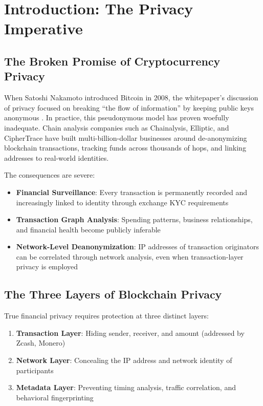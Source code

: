\documentclass[11pt,a4paper]{article}
\begin{document}
\newpage
\tableofcontents
\newpage

\section{Introduction: The Privacy Imperative}

\subsection{The Broken Promise of Cryptocurrency Privacy}

When Satoshi Nakamoto introduced Bitcoin in 2008, the whitepaper's discussion of privacy focused on breaking ``the flow of information'' by keeping public keys anonymous \cite{nakamoto2008bitcoin}. In practice, this pseudonymous model has proven woefully inadequate. Chain analysis companies such as Chainalysis, Elliptic, and CipherTrace have built multi-billion-dollar businesses around de-anonymizing blockchain transactions, tracking funds across thousands of hops, and linking addresses to real-world identities.

The consequences are severe:
\begin{itemize}[leftmargin=*]
    \item \textbf{Financial Surveillance}: Every transaction is permanently recorded and increasingly linked to identity through exchange KYC requirements
    \item \textbf{Transaction Graph Analysis}: Spending patterns, business relationships, and financial health become publicly inferable
    \item \textbf{Network-Level Deanonymization}: IP addresses of transaction originators can be correlated through network analysis, even when transaction-layer privacy is employed
\end{itemize}

\subsection{The Three Layers of Blockchain Privacy}

True financial privacy requires protection at three distinct layers:

\begin{enumerate}[leftmargin=*]
    \item \textbf{Transaction Layer}: Hiding sender, receiver, and amount (addressed by Zcash, Monero)
    \item \textbf{Network Layer}: Concealing the IP address and network identity of participants
    \item \textbf{Metadata Layer}: Preventing timing analysis, traffic correlation, and behavioral fingerprinting
\end{enumerate}
\end{document}
